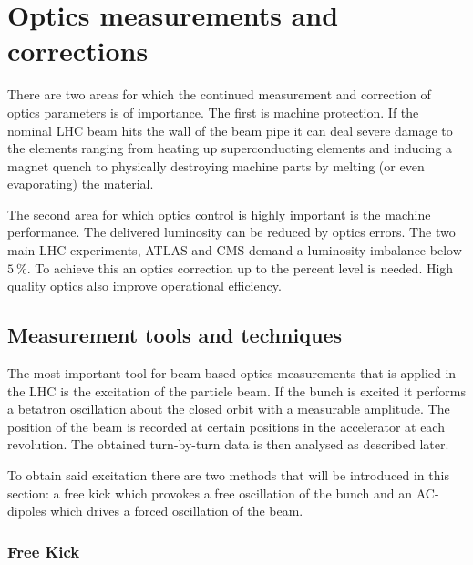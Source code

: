 \section{Optics measurements and corrections}

There are two areas for which the continued measurement and correction of optics parameters is of
importance. The first is machine protection. If the nominal LHC beam hits the wall of the beam pipe
it can deal severe damage to the elements ranging from heating up superconducting elements and
inducing a magnet quench to physically destroying machine parts by melting (or even evaporating) the
material.

The second area for which  optics control is highly important is the machine performance.
The delivered luminosity can be reduced by optics errors.
The two main LHC experiments, ATLAS and CMS demand a luminosity imbalance below $\SI{5}{\percent}$.
To achieve this an optics correction up to the percent level is needed.
High quality optics also improve operational efficiency.

\subsection{Measurement tools and techniques}

The most important tool for beam based optics measurements that is applied in the LHC is the excitation
of the particle beam.
If the bunch is excited it performs a betatron oscillation about the closed orbit with a measurable amplitude.
The position of the beam is recorded at certain positions in the accelerator at each revolution. The
obtained turn-by-turn data is then analysed as described later.

To obtain said excitation there are two methods that will be introduced in this section: a free kick
which provokes a free oscillation of the bunch and an AC-dipoles which drives a forced oscillation of
the beam. 

\subsubsection{Free Kick}


